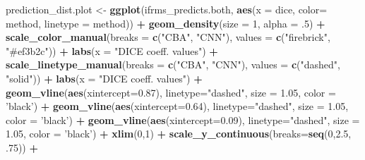 \documentclass[
]{article}
\newenvironment{Shaded}{\begin{snugshade}}{\end{snugshade}}
\newcommand{\DataTypeTok}[1]{\textcolor[rgb]{0.13,0.29,0.53}{#1}}
\newcommand{\DecValTok}[1]{\textcolor[rgb]{0.00,0.00,0.81}{#1}}
\newcommand{\FloatTok}[1]{\textcolor[rgb]{0.00,0.00,0.81}{#1}}
\newcommand{\KeywordTok}[1]{\textcolor[rgb]{0.13,0.29,0.53}{\textbf{#1}}}
\newcommand{\NormalTok}[1]{#1}
\newcommand{\OperatorTok}[1]{\textcolor[rgb]{0.81,0.36,0.00}{\textbf{#1}}}
\newcommand{\StringTok}[1]{\textcolor[rgb]{0.31,0.60,0.02}{#1}}
\begin{document}
\begin{Shaded}
\begin{Highlighting}[]
\NormalTok{prediction_dist.plot <-}\StringTok{ }\KeywordTok{ggplot}\NormalTok{(ifrms_predicts.both, }\KeywordTok{aes}\NormalTok{(}\DataTypeTok{x =}\NormalTok{ dice, }\DataTypeTok{color=}\NormalTok{ method, }\DataTypeTok{linetype =}\NormalTok{ method)) }\OperatorTok{+}
\StringTok{  }\KeywordTok{geom_density}\NormalTok{(}\DataTypeTok{size =} \DecValTok{1}\NormalTok{, }\DataTypeTok{alpha =} \FloatTok{.5}\NormalTok{) }\OperatorTok{+}
\StringTok{  }\KeywordTok{scale_color_manual}\NormalTok{(}\DataTypeTok{breaks =} \KeywordTok{c}\NormalTok{(}\StringTok{"CBA"}\NormalTok{, }\StringTok{"CNN"}\NormalTok{),}
                     \DataTypeTok{values =} \KeywordTok{c}\NormalTok{(}\StringTok{"firebrick"}\NormalTok{, }\StringTok{"#ef3b2c"}\NormalTok{)) }\OperatorTok{+}\StringTok{ }
\StringTok{   }\KeywordTok{labs}\NormalTok{(}\DataTypeTok{x =} \StringTok{"DICE coeff. values"}\NormalTok{)  }\OperatorTok{+}
\StringTok{  }\KeywordTok{scale_linetype_manual}\NormalTok{(}\DataTypeTok{breaks =} \KeywordTok{c}\NormalTok{(}\StringTok{"CBA"}\NormalTok{, }\StringTok{"CNN"}\NormalTok{),}
                        \DataTypeTok{values =} \KeywordTok{c}\NormalTok{(}\StringTok{"dashed"}\NormalTok{, }\StringTok{"solid"}\NormalTok{)) }\OperatorTok{+}\StringTok{ }
\StringTok{   }\KeywordTok{labs}\NormalTok{(}\DataTypeTok{x =} \StringTok{"DICE coeff. values"}\NormalTok{) }\OperatorTok{+}\StringTok{ }
\StringTok{  }\KeywordTok{geom_vline}\NormalTok{(}\KeywordTok{aes}\NormalTok{(}\DataTypeTok{xintercept=}\FloatTok{0.87}\NormalTok{),}
             \DataTypeTok{linetype=}\StringTok{"dashed"}\NormalTok{, }\DataTypeTok{size =} \FloatTok{1.05}\NormalTok{, }\DataTypeTok{color =} \StringTok{'black'}\NormalTok{) }\OperatorTok{+}
\StringTok{  }\KeywordTok{geom_vline}\NormalTok{(}\KeywordTok{aes}\NormalTok{(}\DataTypeTok{xintercept=}\FloatTok{0.64}\NormalTok{),}
             \DataTypeTok{linetype=}\StringTok{"dashed"}\NormalTok{, }\DataTypeTok{size =} \FloatTok{1.05}\NormalTok{, }\DataTypeTok{color =} \StringTok{'black'}\NormalTok{) }\OperatorTok{+}
\StringTok{  }\KeywordTok{geom_vline}\NormalTok{(}\KeywordTok{aes}\NormalTok{(}\DataTypeTok{xintercept=}\FloatTok{0.09}\NormalTok{),}
             \DataTypeTok{linetype=}\StringTok{"dashed"}\NormalTok{, }\DataTypeTok{size =} \FloatTok{1.05}\NormalTok{, }\DataTypeTok{color =} \StringTok{'black'}\NormalTok{) }\OperatorTok{+}
\StringTok{  }\KeywordTok{xlim}\NormalTok{(}\DecValTok{0}\NormalTok{,}\DecValTok{1}\NormalTok{) }\OperatorTok{+}
\StringTok{  }\KeywordTok{scale_y_continuous}\NormalTok{(}\DataTypeTok{breaks=}\KeywordTok{seq}\NormalTok{(}\DecValTok{0}\NormalTok{,}\FloatTok{2.5}\NormalTok{, }\FloatTok{.75}\NormalTok{)) }\OperatorTok{+}


\end{Highlighting}
\end{Shaded}
\end{document}
